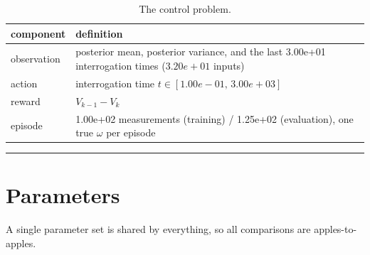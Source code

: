 \documentclass[12pt,a4paper]{article}
\begin{document}
\begin{table}[H]
  \centering
  \caption{The control problem.}
  \label{tab:the-control-problem}
  \small
  \begin{tabular}{@{}>{\raggedright\arraybackslash}p{}
                    >{\raggedright\arraybackslash}p{}@{}}
    \toprule
    component & definition \\
    \midrule
    observation & posterior mean, posterior variance, and the last
                  3.00e+01 interrogation times ($3.20e+01$ inputs) \\
    action & interrogation time $t \in [1.00e-01,\, 3.00e+03]$ \\
    reward & $V_{k-1} - V_k$ \\
    episode & 1.00e+02 measurements (training) / 1.25e+02 (evaluation),
              one true $\omega$ per episode \\
    \bottomrule
  \end{tabular}
\end{table}

\noindent\rule{\textwidth}{0.4pt}
\FloatBarrier

\section{Parameters}
\label{sec:configuration}
A single parameter set is shared by everything, so all comparisons are
apples-to-apples.
\end{document}
